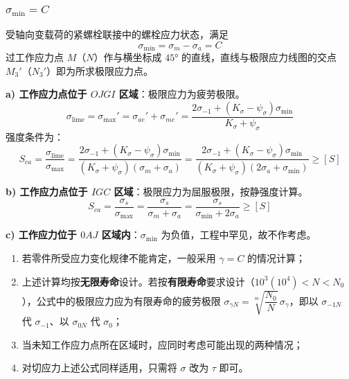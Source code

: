\subsubsection{$\sigma_{\min} = C$}

受轴向变载荷的紧螺栓联接中的螺栓应力状态，满足
\begin{equation}
	\sigma_{\min}=\sigma_m-\sigma_a=C
	\label{eq:强度:sigmaMin等于C}
\end{equation}
过工作应力点 $M$（$N$）作与横坐标成 $45°$ 的直线，直线与极限应力线图的交点 $M_3'$（$N_3'$）即为所求极限应力点。

\begin{theorem}[$\sigma_{\min}=C$ 时的疲劳强度计算]
\label{thm:sigmaMin}
\textbf{a) 工作应力点位于 $OJGI$ 区域}：极限应力为疲劳极限。
\begin{equation}
	\sigma_{\mathrm{lime}}=\sigma_{\max}'=\sigma_{ae}'+\sigma_{me}'=\frac{2\sigma_{-1}+(K_\sigma-\psi_\sigma)\sigma_{\min}}{K_\sigma+\psi_\sigma}
	\label{eq:强度:sigmaMin极限应力}
\end{equation}
强度条件为：
\begin{equation}
	S_{ca}=\frac{\sigma_{\mathrm{lime}}}{\sigma_{\max}}=\frac{2\sigma_{-1}+(K_\sigma-\psi_\sigma)\sigma_{\min}}{(K_\sigma+\psi_\sigma)(\sigma_m+\sigma_a)}=\frac{2\sigma_{-1}+(K_\sigma-\psi_\sigma)\sigma_{\min}}{(K_\sigma+\psi_\sigma)(2\sigma_a+\sigma_{\min})}\ge[S]
	\label{eq:强度:sigmaMin疲劳}
\end{equation}

\textbf{b) 工作应力点位于 $IGC$ 区域}：极限应力为屈服极限，按静强度计算。
\begin{equation}
	S_{ca}=\frac{\sigma_s}{\sigma_{\max}}=\frac{\sigma_s}{\sigma_m+\sigma_a}=\frac{\sigma_s}{\sigma_{\min}+2\sigma_a}\ge[S]
	\label{eq:强度:sigmaMin屈服}
\end{equation}

\textbf{c) 工作应力位于 $0AJ$ 区域内}：$\sigma_{\min}$ 为负值，工程中罕见，故不作考虑。
\end{theorem}

\begin{note}
\begin{enumerate}
	\item 若零件所受应力变化规律不能肯定，一般采用 $\gamma=C$ 的情况计算；
	\item 上述计算均按\textbf{无限寿命}设计。若按\textbf{有限寿命}要求设计（$10^3(10^4)<N<N_0$），公式中的极限应力应为有限寿命的疲劳极限 $\sigma_{\gamma N}=\sqrt[m]{\dfrac{N_0}{N}}\,\sigma_\gamma$，即以 $\sigma_{-1N}$ 代 $\sigma_{-1}$、以 $\sigma_{0N}$ 代 $\sigma_0$；
	\item 当未知工作应力点所在区域时，应同时考虑可能出现的两种情况；
	\item 对切应力上述公式同样适用，只需将 $\sigma$ 改为 $\tau$ 即可。
\end{enumerate}
\end{note}

